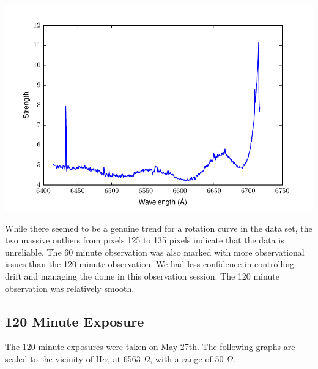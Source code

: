 \documentclass[useAMS,usenatbib]{mn2e}
\begin{document}
\includegraphics[width=\linewidth]{1h-l160u165-spectrum.pdf}

While there seemed to be a genuine trend for a rotation curve in the data set, the two massive outliers from pixels 125 to 135 pixels indicate that the data is unreliable. The 60 minute observation was also marked with more observational issues than the 120 minute observation. We had less confidence in controlling drift and managing the dome in this observation session. The 120 minute observation was relatively smooth.

\subsection*{120 Minute Exposure}

The 120 minute exposures were taken on May 27th. The following graphs are scaled to the vicinity of H$\alpha$, at 6563 $\Omega$, with a range of 50 $\Omega$.
\end{document}
